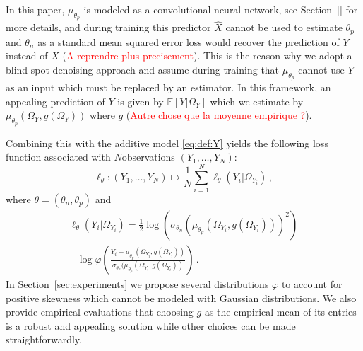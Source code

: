\documentclass{article}
\begin{document}
In this paper, $\mu_{\theta_p}$ is modeled as a convolutional neural network, see Section~\ref{} for more details, and during training this predictor $\widehat X$ cannot be used to estimate $\theta_p$ and $\theta_n$ as  a standard mean squared error loss would recover the prediction of $Y$ instead of $X$ (\textcolor{red}{A reprendre plus precisement}). This is the reason why we adopt a blind spot denoising approach and assume during training that $\mu_{\theta_p}$ cannot use $Y$ as an input which must be replaced by an estimator. In this framework, an appealing prediction of $Y$ is given by $\mathbb{E}[Y|\Omega_Y]$ which we estimate by $\mu_{\theta_p}(\Omega_Y,g(\Omega_Y))$ where $g$ (\textcolor{red}{Autre chose que la moyenne empirique ?}).

Combining this with the additive model  \eqref{eq:def:Y} yields the following loss function associated with $N$observations $(Y_1,\ldots,Y_N)$:
$$
\ell_{\theta}: (Y_1,\ldots,Y_N) \mapsto \frac{1}{N}\sum_{i=1}^N \ell_{\theta}(Y_i|\Omega_{Y_i})\,,
$$
where $\theta = (\theta_n,\theta_p)$ and
\begin{multline*}
\ell_{\theta}(Y_i|\Omega_{Y_i}) = \frac{1}{2}\log(\sigma_{\theta_n}( \mu_{\theta_p}(\Omega_{Y_i},g(\Omega_{Y_i})))^2) \\
-\log \varphi\left(\frac{Y_i-\mu_{\theta_p}(\Omega_{Y_i},g(\Omega_{Y_i}))}{\sigma_{\theta_n}(\mu_{\theta_p}(\Omega_{Y_i},g(\Omega_{Y_i}))}\right)\,. %
\end{multline*}
In Section~\ref{sec:experiments} we propose several distributions $\varphi$ to account for positive skewness which cannot be modeled with Gaussian distributions. We also provide empirical evaluations that choosing $g$ as the empirical mean of its entries is a robust and appealing solution while other choices can be made straightforwardly. 
\end{document}
